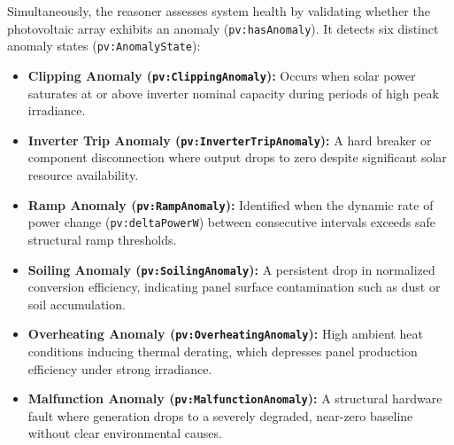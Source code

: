 Simultaneously, the reasoner assesses system health by validating whether the photovoltaic array exhibits an anomaly (\texttt{pv:hasAnomaly}). It detects six distinct anomaly states (\texttt{pv:AnomalyState}):
\begin{itemize}
    \item \textbf{Clipping Anomaly (\texttt{pv:ClippingAnomaly}):} Occurs when solar power saturates at or above inverter nominal capacity during periods of high peak irradiance.
    \item \textbf{Inverter Trip Anomaly (\texttt{pv:InverterTripAnomaly}):} A hard breaker or component disconnection where output drops to zero despite significant solar resource availability.
    \item \textbf{Ramp Anomaly (\texttt{pv:RampAnomaly}):} Identified when the dynamic rate of power change (\texttt{pv:deltaPowerW}) between consecutive intervals exceeds safe structural ramp thresholds.
    \item \textbf{Soiling Anomaly (\texttt{pv:SoilingAnomaly}):} A persistent drop in normalized conversion efficiency, indicating panel surface contamination such as dust or soil accumulation.
    \item \textbf{Overheating Anomaly (\texttt{pv:OverheatingAnomaly}):} High ambient heat conditions inducing thermal derating, which depresses panel production efficiency under strong irradiance.
    \item \textbf{Malfunction Anomaly (\texttt{pv:MalfunctionAnomaly}):} A structural hardware fault where generation drops to a severely degraded, near-zero baseline without clear environmental causes.
\end{itemize}

